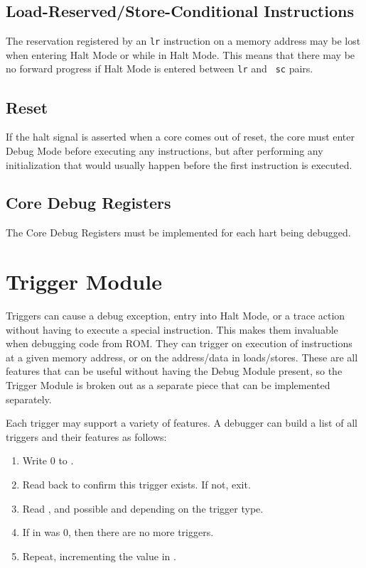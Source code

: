 \documentclass{article}
\newenvironment{steps}[1]
{
   \vspace{1ex}
   \noindent
   #1
   \begin{enumerate}[nosep]
}
{
   \end{enumerate}
   \vspace{1ex}
}
\begin{document}
\subsection{Load-Reserved/Store-Conditional Instructions}

The reservation registered by an {\tt lr} instruction on a memory address may
be lost when entering Halt Mode or while in Halt Mode.  This means that there
may be no forward progress if Halt Mode is entered between {\tt lr} and {\tt
sc} pairs.

\subsection{Reset}

If the halt signal is asserted when a core comes out of reset, the core must
enter Debug Mode before executing any instructions, but after performing any
initialization that would usually happen before the first instruction is
executed.

\subsection{Core Debug Registers} \label{debreg}

The Core Debug Registers must be implemented for each hart being debugged.



\section{Trigger Module}

Triggers can cause a debug exception, entry into Halt Mode, or a trace action
without having to execute a special instruction. This makes them invaluable
when debugging code from ROM. They can trigger on execution of instructions at
a given memory address, or on the address/data in loads/stores.  These are all
features that can be useful without having the Debug Module present, so the
Trigger Module is broken out as a separate piece that can be implemented
separately.

\begin{steps}{Each trigger may support a variety of features. A debugger can
    build a list of all triggers and their features as follows:}
\item Write 0 to \Rtselect.
\item Read back \Rtselect to confirm this trigger exists. If not, exit.
\item Read \Rtdataone, and possible \Rtdatatwo and \Rtdatathree depending on the
    trigger type.
\item If \Ftype in \Rtdataone was 0, then there are no more triggers.
\item Repeat, incrementing the value in \Rtselect.
\end{steps}
\end{document}
